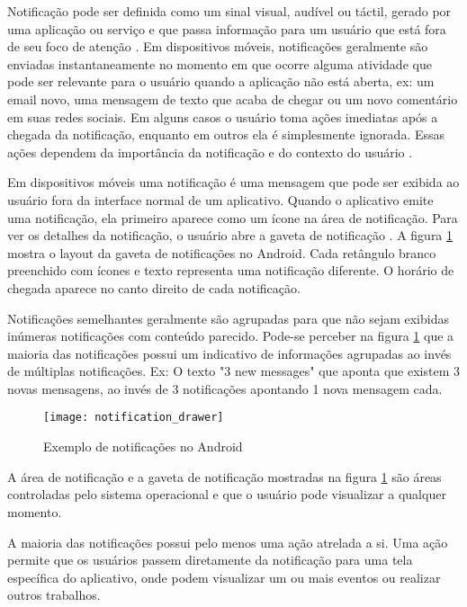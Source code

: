 Notificação pode ser definida como um sinal visual, audível ou táctil, gerado por uma aplicação
ou serviço e que passa informação para um usuário que está fora de seu foco de atenção \cite{iqbal2010notifications}.
Em dispositivos móveis, notificações geralmente são enviadas instantaneamente no momento em que ocorre alguma atividade que pode ser relevante
para o usuário quando a aplicação não está aberta, ex: um email novo, uma mensagem de texto que acaba de chegar ou um
novo comentário em suas redes sociais. Em alguns casos o usuário toma ações imediatas após a chegada da notificação,
enquanto em outros ela é simplesmente ignorada. Essas ações dependem da importância da notificação e do contexto do
usuário \cite{sahami2014large}.

Em dispositivos móveis uma notificação é uma mensagem que pode ser exibida ao usuário fora da interface normal de um aplicativo.
Quando o aplicativo emite uma notificação, ela primeiro aparece como um ícone na área de notificação. Para ver os detalhes da
notificação, o usuário abre a gaveta de notificação \cite{notificationDrawer}. A figura \ref{notification-drawer} mostra
o layout da gaveta de notificações no Android. Cada retângulo branco preenchido com ícones e texto representa uma notificação
diferente. O horário de chegada aparece no canto direito de cada notificação.

Notificações semelhantes geralmente são agrupadas para que não sejam exibidas inúmeras notificações com conteúdo parecido.
Pode-se perceber na figura \ref{notification-drawer} que a maioria das notificações possui um indicativo de informações agrupadas
ao invés de múltiplas notificações. Ex: O texto "3 new messages" que aponta que existem 3 novas mensagens, ao invés de 3
notificações apontando 1 nova mensagem cada.

\begin{figure}[h]
\centering
\texttt{[image: notification\_drawer]}
\caption{Exemplo de notificações no Android \cite{notificationDrawer}}
\label{notification-drawer}
\end{figure}

A área de notificação e a gaveta de notificação mostradas na figura \ref{notification-drawer} são áreas controladas pelo
sistema operacional e que o usuário pode visualizar a qualquer momento.

A maioria das notificações possui pelo menos uma ação atrelada a si. Uma ação permite que os usuários passem
diretamente da notificação para uma tela específica do aplicativo, onde podem visualizar um ou mais eventos ou realizar
outros trabalhos.

